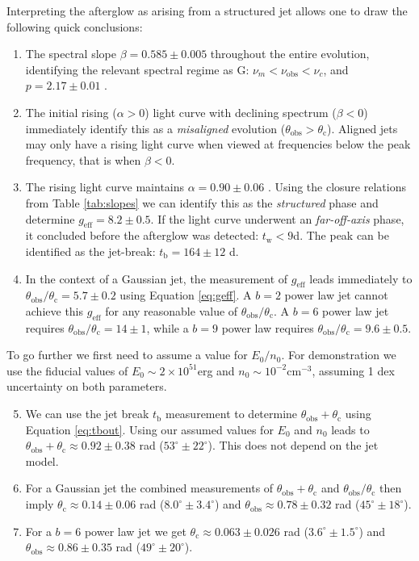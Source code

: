 \documentclass[twocolumn]{aastex62}
\newcommand{\tW}{\ensuremath{t_{\mathrm{w}}}}
\newcommand{\tb}{\ensuremath{t_{\mathrm{b}}}}
\newcommand{\nuobs}{\ensuremath{\nu_{\mathrm{obs}}}}
\newcommand{\thobs}{\ensuremath{\theta_{\mathrm{obs}}}}
\newcommand{\thC}{\ensuremath{\theta_{\mathrm{c}}}}
\newcommand{\geff}{\ensuremath{g_{\mathrm{eff}}}}
\begin{document}
Interpreting the afterglow as arising from a structured jet allows one to draw the following quick conclusions:
\begin{enumerate}
	\item The spectral slope $\beta = 0.585 \pm 0.005$ throughout the entire evolution, identifying the relevant spectral regime as G: $\nu_m < \nuobs < \nu_c$, and $p = 2.17 \pm 0.01$ \citep{Troja:2019ab}.
	\item The initial rising ($\alpha > 0$) light curve with declining spectrum ($\beta < 0$) immediately identify this as a \emph{misaligned} evolution ($\thobs > \thC$).  Aligned jets may only have a rising light curve when viewed at frequencies below the peak frequency, that is when $\beta < 0$.
	\item The rising light curve maintains $\alpha  = 0.90 \pm 0.06$ \citep{Troja:2019ab}.  Using the closure relations from Table \ref{tab:slopes} we can identify this as the \emph{structured} phase and determine $\geff = 8.2 \pm 0.5$.  If the light curve underwent an \emph{far-off-axis} phase, it concluded before the afterglow was detected: $\tW < 9$d.  The peak can be identified as the jet-break: $\tb = 164 \pm 12$ d.
	\item In the context of a Gaussian jet, the measurement of $\geff$ leads immediately to $\thobs / \thC = 5.7 \pm 0.2$ using Equation \eqref{eq:geff}.  A $b=2$ power law jet cannot achieve this $\geff$ for any reasonable value of $\thobs / \thC$.  A $b=6$ power law jet requires $\thobs/\thC = 14 \pm 1$, while a $b=9$ power law requires $\thobs/\thC = 9.6\pm 0.5$.
\end{enumerate}
To go further we first need to assume a value for $E_0 / n_0$. For demonstration we use the \citet{Fong:2015aa} fiducial values of $E_0 \sim 2\times 10^{51}$erg and $n_0 \sim 10^{-2}$cm$^{-3}$, assuming 1 dex uncertainty on both parameters.
\begin{enumerate}
	\setcounter{enumi}{4}
	\item We can use the jet break $\tb$ measurement to determine $\thobs + \thC$ using Equation \eqref{eq:tbout}. Using our assumed values for  $E_0$ and $n_0$ leads to $\thobs + \thC \approx 0.92 \pm 0.38$ rad ($53^\circ \pm 22^\circ$). This does not depend on the jet model.
	\item For a Gaussian jet the combined measurements of $\thobs +\thC$ and $\thobs/\thC$ then imply $\thC \approx 0.14 \pm 0.06$ rad ($8.0^\circ  \pm 3.4^\circ$) and $\thobs \approx 0.78 \pm 0.32$ rad ($45^\circ \pm 18^\circ$).
	\item For a $b=6$ power law jet we get $\thC \approx 0.063 \pm 0.026$ rad ($3.6^\circ  \pm 1.5^\circ$) and $\thobs \approx 0.86 \pm 0.35$ rad ($49^\circ \pm 20^\circ$).
\end{enumerate}
\end{document}
